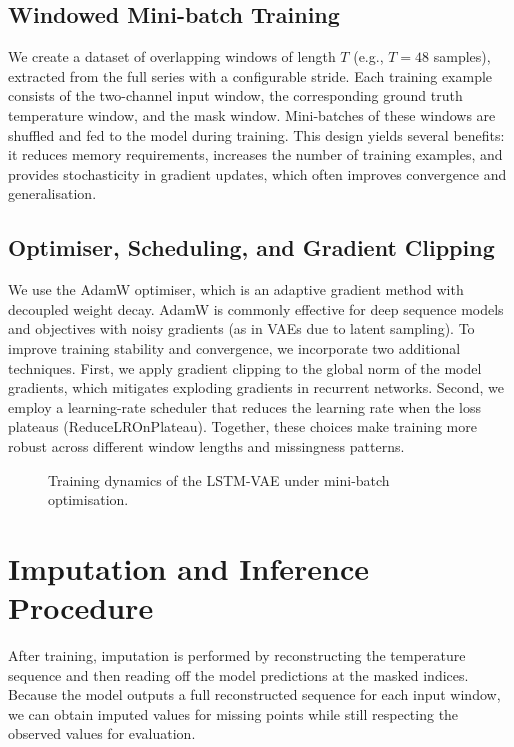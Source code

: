 \subsection{Windowed Mini-batch Training}
We create a dataset of overlapping windows of length $T$ (e.g., $T=48$ samples), extracted from the full series with a configurable stride. Each training example consists of the two-channel input window, the corresponding ground truth temperature window, and the mask window. Mini-batches of these windows are shuffled and fed to the model during training. This design yields several benefits: it reduces memory requirements, increases the number of training examples, and provides stochasticity in gradient updates, which often improves convergence and generalisation.

\subsection{Optimiser, Scheduling, and Gradient Clipping}
We use the AdamW optimiser, which is an adaptive gradient method with decoupled weight decay. AdamW is commonly effective for deep sequence models and objectives with noisy gradients (as in VAEs due to latent sampling). To improve training stability and convergence, we incorporate two additional techniques. First, we apply gradient clipping to the global norm of the model gradients, which mitigates exploding gradients in recurrent networks. Second, we employ a learning-rate scheduler that reduces the learning rate when the loss plateaus (ReduceLROnPlateau). Together, these choices make training more robust across different window lengths and missingness patterns.

\begin{figure}[ht]
	\centering
	\caption{Training dynamics of the LSTM-VAE under mini-batch optimisation.}
	\label{fig:training-curve}
\end{figure}

\section{Imputation and Inference Procedure}
After training, imputation is performed by reconstructing the temperature sequence and then reading off the model predictions at the masked indices. Because the model outputs a full reconstructed sequence for each input window, we can obtain imputed values for missing points while still respecting the observed values for evaluation.

